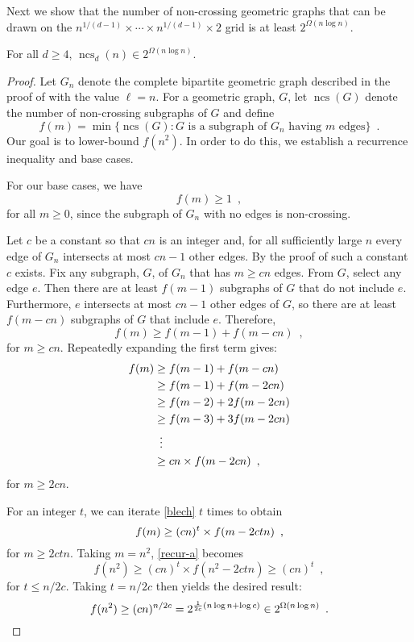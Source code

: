 \documentclass{patmorin}
\DeclareMathOperator{\ncs}{ncs}
\begin{document}
Next we show that the number of non-crossing geometric graphs that can
be drawn on the $n^{1/(d-1)}\times \cdots\times n^{1/(d-1)}\times 2$
grid is at least $2^{\Omega(n\log n)}$.

\begin{thm}
  For all $d\ge 4$, $\ncs_d(n) \in 2^{\Omega(n\log n)}$.
\end{thm}

\begin{proof}
  Let $G_n$ denote the complete bipartite geometric graph described in
  the proof of  with the value $\ell=n$.  For a
  geometric graph, $G$, let $\ncs(G)$ denote the number of non-crossing
  subgraphs of $G$ and define
  \[
     f(m) = \min\{ \ncs(G) : 
                \mbox{$G$ is a subgraph of $G_{n}$ having $m$ edges} \}
     \enspace . 
  \]
  Our goal is to lower-bound $f(n^2)$.  In order to do this, we establish
  a recurrence inequality and base cases.
  
  For our base cases, we have 
  \[ 
     f(m)\ge 1 \enspace ,
  \]
  for all $m\ge 0$, since the subgraph of $G_{n}$ with no edges is
  non-crossing.
  
  Let $c$ be a constant so that $cn$ is an integer and, for all
  sufficiently large $n$ every edge of $G_n$ intersects at most $cn-1$
  other edges.  By the proof of  such a constant
  $c$ exists.  Fix any subgraph, $G$, of $G_{n}$ that has $m\ge cn$ edges.
  From $G$, select any edge $e$. Then there are at least $f(m-1)$
  subgraphs of $G$ that do not include $e$.  Furthermore, $e$ intersects
  at most $cn-1$ other edges of $G$, so there are at least $f(m-cn)$
  subgraphs of $G$ that include $e$.  Therefore,
  \[  
     f(m) \ge f(m-1) + f(m-cn) \enspace ,
  \]
  for $m\ge cn$.  Repeatedly expanding the first term gives:
  \begin{align}
  f(m) & \ge  f(m-1) + f(m-cn) \notag \\
         & \ge  f(m-1) + f(m-2cn) \notag \\
         & \ge  f(m-2) + 2f(m-2cn) \notag \\
         & \ge  f(m-3) + 3f(m-2cn) \notag \\
         & \,\,\,\vdots  \notag \\
         & \ge  cn\times f(m-2cn) \enspace , \eqlabel{blech}
  \end{align}
  for $m\ge 2cn$.
  
  For an integer $t$, we can iterate \eqref{blech} $t$ times to obtain
  \begin{equation}
     f(m) \ge (cn)^t\times f(m-2ctn) \enspace ,
     \eqlabel{recur-a}
  \end{equation} 
  for $m\ge 2ctn$.  Taking $m=n^2$, \eqref{recur-a} becomes
  \[
     f(n^2) \ge (cn)^t\times f(n^2-2ctn) \ge (cn)^t \enspace ,
  \]
  for $t \le n/2c$.  Taking $t=n/2c$ then yields the desired result:
  \[
     f(n^2) \ge (cn)^{n/2c} 
            = 2^{\frac{1}{2c}(n\log n+\log c)} 
            \in 2^{\Omega(n\log n)} \enspace . \qedhere
  \]
\end{proof}
\end{document}

